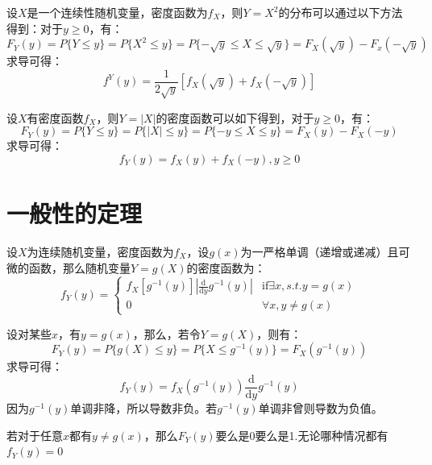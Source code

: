 \documentclass[10pt,a4paper,UTF8]{article}
\begin{document}
\begin{tikzinstance}
设\(X\)是一个连续性随机变量，密度函数为\(f_{X}\)，则\(Y = X^{2}\)的分布可以通过以下方法得到：对于\(y\geq 0\)，有：
\begin{equation}
\label{eq:3}
F_{Y}(y) = P\{Y\leq y\} = P\{X^{2} \leq y\}  = P\{-\sqrt{y} \leq X \leq \sqrt{y} \} = F_{X}(\sqrt{y}) - F_{x}(-\sqrt{y})
\end{equation}
求导可得：
\begin{equation}
\label{eq:4}
f^{Y}(y) = \frac{1}{2\sqrt{y}} [f_{X}(\sqrt{y}) + f_{X}(-\sqrt{y}) ]
\end{equation}
\end{tikzinstance}

\begin{tikzinstance}
设\(X\)有密度函数\(f_{X}\)，则\(Y=|X|\)的密度函数可以如下得到，对于\(y\geq 0\)，有：
\begin{equation}
\label{eq:5}
F_{Y}(y) = P\{Y \leq y\} = P\{ |X| \leq y\} = P\{ -y \leq X \leq y\} = F_{X}(y) - F_{X}(-y)
\end{equation}
求导可得：
\begin{equation}
\label{eq:6}
f_{Y}(y) = f_{X}(y) + f_{X}(-y) ,y\geq 0
\end{equation}
\end{tikzinstance}
\section{一般性的定理}
\label{sec:orgfbd4c25}


\begin{tikztheorem}
设\(X\)为连续随机变量，密度函数为\(f_{X}\)，设\(g(x)\)为一严格单调（递增或递减）且可微的函数，那么随机变量\(Y=g(X)\)的密度函数为：
\begin{equation}
\label{eq:7}
f_{Y}(y) =
\begin{cases}
f_{X}[g^{-1}(y)]|\frac{\mathrm{d}}{\mathrm{d}y}g^{-1}(y)| & \mathrm{if}\exists x,s.t. y = g(x)\\
0 & \forall x, y\neq g(x)
\end{cases}
\end{equation}
\end{tikztheorem}
\begin{tikzproof}
设对某些\(x\)，有\(y=g(x)\)，那么，若令\(Y = g(X)\)，则有：
\begin{equation}
\label{eq:9}
F_{Y}(y) = P\{g(X)\leq y\} = P\{X \leq g^{-1}(y)\} = F_{X}(g^{-1}(y))
\end{equation}
求导可得：
\begin{equation}
\label{eq:10}
f_{Y}(y) = f_{X}(g^{-1}(y)) \frac{\mathrm{d}}{\mathrm{d}y}g^{-1}(y)
\end{equation}
因为\(g^{-1}(y)\)单调非降，所以导数非负。若\(g^{-1}(y)\)单调非曾则导数为负值。

若对于任意\(x\)都有\(y\neq g(x)\)，那么\(F_{Y}(y)\)要么是0要么是1.无论哪种情况都有\(f_{Y}(y) = 0\)
\end{tikzproof}
\end{document}
